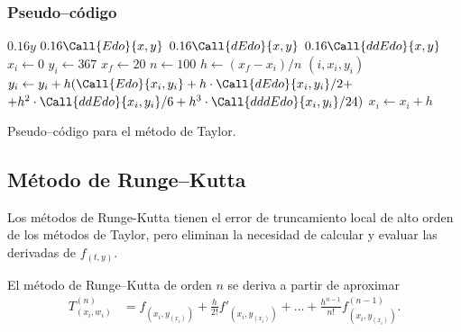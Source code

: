 \documentclass[
    english, spanish, Ce-table, Ce-theorem
]{CabesHW}
\begin{document}
\subsubsection{Pseudo--código}
\begin{algorithm}[H]
    \centering
    \begin{myalg}[1]
     
        \State \Output $0.16 y$
    \EndFunction
    \State \phantom{}
     
        \State \Output $0.16 \Call{Edo}{x,y}$
    \EndFunction
    \State \phantom{}
     
        \State \Output $0.16 \Call{dEdo}{x,y}$
    \EndFunction
    \State \phantom{}
     
        \State \Output $0.16 \Call{ddEdo}{x,y}$
    \EndFunction
    \State \phantom{}
    \State $x_i \gets 0$ 
    \State $y_i \gets 367$ 
    \State $x_f \gets 20$ 
    \State $n \gets 100$ 
    \State \phantom{}
    \State $h \gets (x_f - x_i)/n$ 
        \State \Output $(i, x_i, y_i)$
        \State \phantom{}
        \State $y_i \gets y_i + h(\Call{Edo}{x_i, y_i} + h\cdot\Call{dEdo}{x_i, y_i}/2 + $
        \Statex \hspace{5em}$+ h^2\cdot\Call{ddEdo}{x_i, y_i}/6 + h^3\cdot\Call{dddEdo}{x_i, y_i}/24)$
        \State $x_i \gets x_i + h$
    \EndFor
    \end{myalg}
    \caption{Pseudo--código para el método de Taylor.}
    \label{alg:taylor}
\end{algorithm}

\vspace{1em}
\subsection{Método de Runge--Kutta}
Los métodos de Runge-Kutta tienen el error de truncamiento local de alto orden de los métodos de Taylor, pero eliminan la necesidad de calcular y evaluar las derivadas de $f_{(t, y)}$.

El método de Runge--Kutta de orden $n$ se deriva a partir de aproximar
\begin{align*}
    T^{(n)}_{(x_i, w_i)} &= f_{(x_i, y_{(x_i)})} + \frac{h}{2!}f'_{(x_i, y_{(x_i)})} + \ldots + \frac{h^{n-1}}{n!}f^{(n-1)}_{(x_i, y_{(x_i)})}. 
\end{align*}
\end{document}
